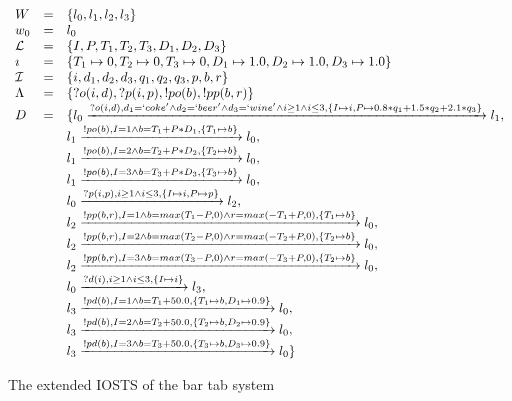   \begin{figure}[ht]
    \begin{center}
      $\begin{array}{lcl}
      W & = & \{l_0, l_1, l_2, l_3\} \\
      w_0 & = & l_0 \\
      \mathcal{L} & = & \{I, P, T_1, T_2, T_3, D_1, D_2, D_3\} \\
      \imath & = & \{T_1 \mapsto 0, T_2 \mapsto 0, T_3 \mapsto 0, D_1 \mapsto 1.0, D_2 \mapsto 1.0, D_3 \mapsto 1.0\} \\
      \mathcal{I} & = & \{i, d_1, d_2, d_3, q_1, q_2, q_3, p, b, r\} \\
      \Lambda & = & \{?o(i,d), ?p(i,p), !po(b), !pp(b, r)\} \\
      D & = & \{l_0\xrightarrow{?o(i,d), d_1=`coke' \land d_2=`beer' \land d_3=`wine' \land i \geq 1 \land i \leq 3, \{I \mapsto i, P \mapsto 0.8*q_1+1.5*q_2+2.1*q_3\}}l_1, \\
      & & l_1\xrightarrow{!po(b), I=1\land b=T_1+P*D_1, \{T_1 \mapsto b\}}l_0,\\
      & & l_1\xrightarrow{!po(b), I=2\land b=T_2+P*D_2, \{T_2 \mapsto b\}}l_0,\\
      & & l_1\xrightarrow{!po(b), I=3\land b=T_3+P*D_3, \{T_3 \mapsto b\}}l_0,\\
      & & l_0\xrightarrow{?p(i,p), i \geq 1 \land i \leq 3, \{I \mapsto i, P \mapsto p\}}l_2,\\
      & & l_2\xrightarrow{!pp(b,r),I=1\land b=max(T_1-P, 0)\land r=max(-T_1+P,0),\{T_1 \mapsto b\}}l_0,\\
      & & l_2\xrightarrow{!pp(b,r),I=2\land b=max(T_2-P, 0)\land r=max(-T_2+P,0),\{T_2 \mapsto b\}}l_0, \\
      & & l_2\xrightarrow{!pp(b,r),I=3\land b=max(T_3-P, 0)\land r=max(-T_3+P,0),\{T_2 \mapsto b\}}l_0, \\
      & & l_0\xrightarrow{?d(i), i \geq 1 \land i \leq 3,\{I \mapsto i\}}l_3, \\
      & & l_3\xrightarrow{!pd(b), I=1\land b=T_1+50.0, \{T_1 \mapsto b, D_1 \mapsto 0.9\}}l_0, \\
      & & l_3\xrightarrow{!pd(b), I=2\land b=T_2+50.0, \{T_2 \mapsto b, D_2 \mapsto 0.9\}}l_0, \\
      & & l_3\xrightarrow{!pd(b), I=3\land b=T_3+50.0, \{T_3 \mapsto b, D_3 \mapsto 0.9\}}l_0 \}
      \end{array}$
    \end{center}
    \caption{The extended IOSTS of the bar tab system}
    \label{fig:sts-bartab-extended}
  \end{figure}

